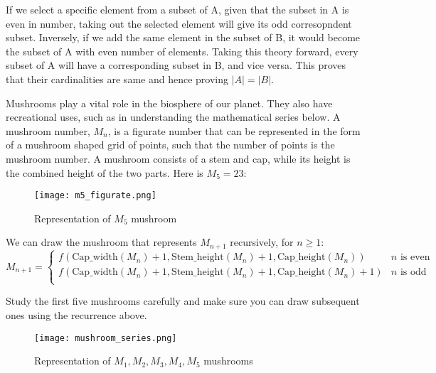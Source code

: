 \documentclass[addpoints]{exam}
\begin{document}
\begin{questions}
  \begin{solution}
    
If we select a specific element from a subset of A, given that the subset in A is even in number, taking out the selected element will give its odd corresopndent subset. Inversely, if we add the same element in the subset of B, it would become the subset of A with even number of elements. Taking this theory forward, every subset of A will have a corresponding subset in B, and vice versa. This proves that their cardinalities are same and hence proving $|A| = |B|$. 
  \end{solution}
  
\question Mushrooms play a vital role in the biosphere of our planet. They also have recreational uses, such as in understanding the mathematical series below. A mushroom number, $M_n$, is a figurate number that can be represented in the form of a mushroom shaped grid of points, such that the number of points is the mushroom number. A mushroom consists of a stem and cap, while its height is the combined height of the two parts. Here is $M_5=23$:

\begin{figure}[h]
  \centering
  \texttt{[image: m5\_figurate.png]}
  \caption{Representation of $M_5$ mushroom}
  \label{fig:mushroom_anatomy}
\end{figure}

We can draw the mushroom that represents $M_{n+1}$ recursively, for $n \geq 1$:
\[ 
    M_{n+1}=
    \begin{cases} 
      f(\textrm{Cap\_width}(M_n) + 1, \textrm{Stem\_height}(M_n) + 1, \textrm{Cap\_height}(M_n))  & n \textrm{ is even} \\
      f(\textrm{Cap\_width}(M_n) + 1, \textrm{Stem\_height}(M_n) + 1, \textrm{Cap\_height}(M_n)+1) & n \textrm{ is odd}  \\      
   \end{cases}
\]

Study the first five mushrooms carefully and make sure you can draw subsequent ones using the recurrence above.

\begin{figure}[h]
  \centering
  \texttt{[image: mushroom\_series.png]}
  \caption{Representation of $M_1,M_2,M_3,M_4,M_5$ mushrooms}
  \label{fig:mushroom_anatomy}
\end{figure}

\end{questions}
\end{document}
